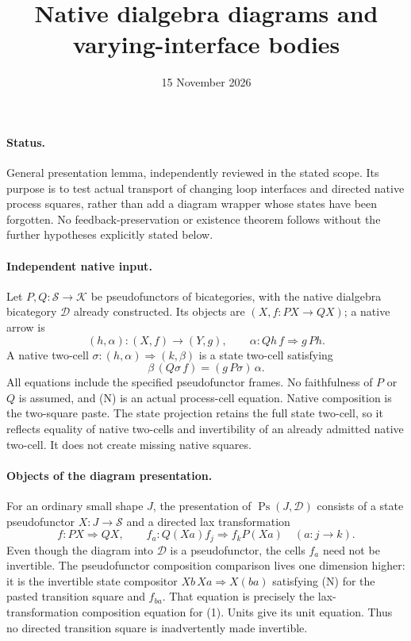 \documentclass{article}
\title{Native dialgebra diagrams and varying-interface bodies}
\date{15 November 2026}
\begin{document}
\maketitle
\paragraph{Status.} General presentation lemma, independently reviewed in the stated scope. Its purpose is to test actual transport of changing loop interfaces and directed native process squares, rather than add a diagram wrapper whose states have been forgotten. No feedback-preservation or existence theorem follows without the further hypotheses explicitly stated below.

\paragraph{Independent native input.} Let $P,Q:\mathcal S\to\mathcal K$ be pseudofunctors of bicategories, with the native dialgebra bicategory $\mathcal D$ already constructed. Its objects are $(X,f:PX\to QX)$; a native arrow is
\[
 (h,\alpha):(X,f)\to(Y,g),\qquad
 \alpha:Qh\,f\Rightarrow g\,Ph.
\]
A native two-cell $\sigma:(h,\alpha)\Rightarrow(k,\beta)$ is a state two-cell satisfying
\[
 \beta\,(Q\sigma\,f)=(g\,P\sigma)\,\alpha.
\tag{N}
\]
All equations include the specified pseudofunctor frames. No faithfulness of $P$ or $Q$ is assumed, and (N) is an actual process-cell equation. Native composition is the two-square paste. The state projection retains the full state two-cell, so it reflects equality of native two-cells and invertibility of an already admitted native two-cell. It does not create missing native squares.

\paragraph{Objects of the diagram presentation.} For an ordinary small shape $J$, the presentation of $\operatorname{Ps}(J,\mathcal D)$ consists of a state pseudofunctor $X:J\to\mathcal S$ and a directed lax transformation
\[
 f:PX\Rightarrow QX,\qquad
 f_a:Q(Xa)f_j\Rightarrow f_kP(Xa)
 \quad(a:j\to k).
\tag{1}
\]
Even though the diagram into $\mathcal D$ is a pseudofunctor, the cells $f_a$ need not be invertible. The pseudofunctor composition comparison lives one dimension higher: it is the invertible state compositor $Xb\,Xa\Rightarrow X(ba)$ satisfying (N) for the pasted transition square and $f_{ba}$. That equation is precisely the lax-transformation composition equation for (1). Units give its unit equation. Thus no directed transition square is inadvertently made invertible.
\end{document}

